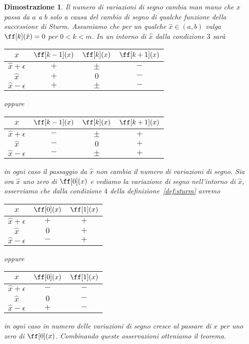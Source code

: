\documentclass[twoside,10pt]{article}
\theoremstyle{plain}
\theoremstyle{nonumberplain}
\newtheorem{dimostrazione}{Dimostrazione}
\begin{document}
\begin{dimostrazione}
    Il numero di variazioni di segno cambia man mano che $x$ passa da
    $a$ a $b$ solo a causa del cambio di segno di qualche funzione
    della successione di Sturm.  Assumiamo che per un qualche
    $\hat{x}\in(a,b)$ valga $\ff[k](\hat{x})=0$ per $0<k<m$.  In un
    intorno di $\hat{x}$ dalla condizione $3$ sar\`a
    \begin{center}
        \begin{tabular}{c|ccc}
            $x$ & $\ff[k-1](x)$ & $\ff[k](x)$ & $\ff[k+1](x)$ \\
            \hline
            $\hat{x}+\epsilon$ & $+$ & $\pm$ & $-$ \\
            $\hat{x}         $ & $+$ & $0$   & $-$ \\
            $\hat{x}-\epsilon$ & $+$ & $\pm$ & $-$ \\
            \hline
        \end{tabular}
        \qquad oppure \qquad 
        \begin{tabular}{c|ccc}
            $x$ & $\ff[k-1](x)$ & $\ff[k](x)$ & $\ff[k+1](x)$ \\
            \hline
            $\hat{x}+\epsilon$ & $-$ & $\pm$ & $+$ \\
            $\hat{x}         $ & $-$ & $0$   & $+$ \\
            $\hat{x}-\epsilon$ & $-$ & $\pm$ & $+$ \\
            \hline
        \end{tabular}
    \end{center}
    in ogni caso il passaggio da $\hat{x}$ non cambia il numero di
    variazioni di segno.  Sia ora $\hat{x}$ uno zero di $\ff[0](x)$ e
    vediamo la variazione di segno nell'intorno di $\hat{x}$,
    osserviamo che dalla condizione $4$ della
    definizione~\ref{def:sturm} avremo
    \begin{center}
        \begin{tabular}{c|cc}
            $x$ & $\ff[0](x)$ & $\ff[1](x)$ \\
            \hline
            $\hat{x}+\epsilon$ & $+$ & $+$\\
            $\hat{x}         $ & $0$ & $+$\\
            $\hat{x}-\epsilon$ & $-$ & $+$\\
            \hline
        \end{tabular}
        \qquad oppure \qquad 
        \begin{tabular}{c|cc}
            $x$ & $\ff[0](x)$ & $\ff[1](x)$ \\
            \hline
            $\hat{x}+\epsilon$ & $-$ & $-$ \\
            $\hat{x}         $ & $0$ & $-$ \\
            $\hat{x}-\epsilon$ & $+$ & $-$ \\
            \hline
        \end{tabular}
    \end{center}
    in ogni caso in numero delle variazioni di segno cresce al passare
    di $x$ per uno zero di $\ff[0](x)$.  Combinando queste
    osservazioni otteniamo il teorema.
\end{dimostrazione}
\end{document}
